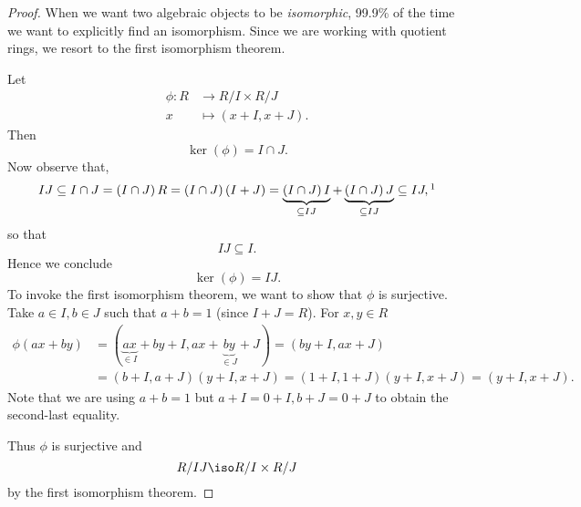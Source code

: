 \documentclass[pmath441]{subfiles}
\begin{document}
    \begin{proof}
        When we want two algebraic objects to be \textit{isomorphic}, 99.9\% of the time we want to explicitly find an isomorphism. Since we are working with quotient rings, we resort to the first isomorphism theorem.

        Let
        \begin{equation*}
            \begin{aligned}
                \phi:R&\to R /I\times R /J \\
                x & \mapsto \left( x+I,x+J \right).
            \end{aligned} 
        \end{equation*}
        Then
        \begin{equation*}
            \ker\left( \phi \right) = I\cap J.
        \end{equation*}
        Now observe that,
        \begin{equation*}
            IJ\subseteq I\cap J = \left( I\cap J \right)R = \left( I\cap J \right)\left( I+J \right) = \underbrace{\left( I\cap J \right)I}_{\subseteq IJ} + \underbrace{\left( I\cap J \right)J}_{\subseteq IJ} \subseteq IJ,\footnotemark[1]
        \end{equation*} 
        so that
        \begin{equation*}
            IJ \subseteq I.
        \end{equation*}
        Hence we conclude
        \begin{equation*}
            \ker\left( \phi \right) = IJ.
        \end{equation*}
        To invoke the first isomorphism theorem, we want to show that $\phi$ is surjective. Take $a\in I, b\in J$ such that $a+b = 1$ (since $I+J=R$). For $x,y\in R$
        \begin{equation*}
            \begin{aligned}
                \phi\left( ax+by \right) & = \left( \underbrace{ax}_{\in I}+by+I,ax+\underbrace{by}_{\in J}+J \right) = \left( by+I,ax+J \right) \\
                                         & = \left( b+I,a+J \right)\left( y+I,x+J \right) = \left( 1+I,1+J \right)\left( y+I,x+J \right) = \left( y+I,x+J \right).
            \end{aligned} 
        \end{equation*}
        Note that we are using $a+b=1$ but $a+I=0+I, b+J=0+J$ to obtain the second-last equality.

        Thus $\phi$ is surjective and
        \begin{equation*}
            R /IJ \iso R /I\times R /J
        \end{equation*}
        by the first isomorphism theorem.
        
        \noindent
        \begin{minipage}{\textwidth}
        \end{minipage}
    \end{proof}
    
\end{document}
